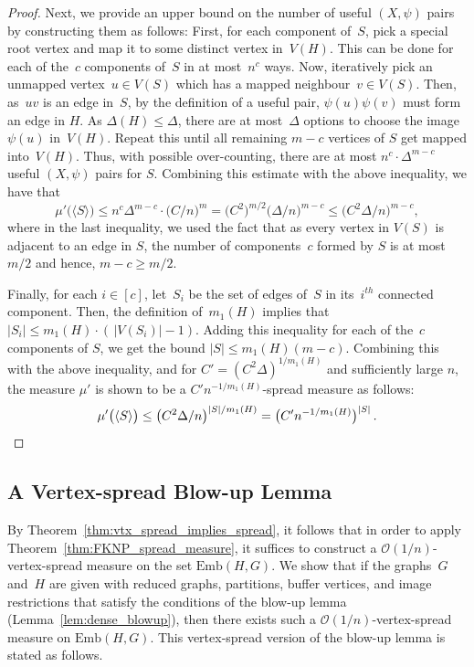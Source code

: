 \documentclass[final]{article}
\theoremstyle{definition}
\newcommand{\Emb}{\mathrm{Emb}}
\begin{document}
\begin{proof}
    Next, we provide an upper bound on the number of useful $(X, \psi)$ pairs by constructing them as follows: First, for each component of~$S$, pick a special root vertex and map it to some distinct vertex in~$V(H)$. This can be done for each of the~$c$ components of~$S$ in at most~$n^c$ ways. Now, iteratively pick an unmapped vertex~$u \in V(S)$ which has a mapped neighbour~$v \in V(S)$. Then, as~$uv$ is an edge in~$S$, by the definition of a useful pair, $\psi(u)\psi(v)$ must form an edge in $H$. As $\Delta(H) \leq \Delta$, there are at most~$\Delta$ options to choose the image~$\psi(u)$ in~$V(H)$. Repeat this until all remaining $m-c$ vertices of $S$ get mapped into~$V(H)$. Thus, with possible over-counting, there are at most $n^c \cdot \Delta^{m-c}$ useful $(X, \psi)$ pairs for $S$. Combining this estimate with the above inequality, we have that  
    $$\mu'\bigl(\langle S \rangle\bigr) \leq n^c \Delta^{m-c}\cdot \bigl(C/n\bigr)^m =  \bigl({C^2\bigr)^{m/2}\bigl(\Delta}/{n}\bigr)^{m-c} \leq \bigl(C^2\Delta/n\bigr)^{m-c},$$
    where in the last inequality, we used the fact that as every vertex in $V(S)$ is adjacent to an edge in $S$, the number of components~$c$ formed by $S$ is at most $m/2$ and hence, $m - c \geq m/2$.
    
    Finally, for each $i \in [c]$, let~$S_i$ be the set of edges of~$S$ in its~$i^{th}$ connected component. Then, the definition of~$m_1(H)$ implies that $|S_i| \leq m_1(H)\cdot(\, |V(S_i)| -1)$. Adding this inequality for each of the~$c$ components of $S$, we get the bound $|S| \leq m_1(H)(m-c)$. Combining this with the above inequality, and for $C' = (C^2\Delta)^{1/m_1(H)}$ and sufficiently large $n$, the measure $\mu'$ is shown to be a $C'n^{-1/m_1(H)}$-spread measure as follows:
    \[ \mu'\bigl(\langle S \rangle \bigr) \leq \big({C^2\Delta}/{n}\big)^{{|S|}/{m_1(H)}} = \big(C'n^{-1/m_1(H)}\big)^{|S|}\,. \qedhere \]
\end{proof}

\subsection{A Vertex-spread Blow-up Lemma}

By Theorem~\ref{thm:vtx_spread_implies_spread}, it follows that in order to apply Theorem~\ref{thm:FKNP_spread_measure}, it suffices to construct a $\mathcal{O}(1/n)$-vertex-spread measure on the set $\Emb(H,G)$.  We show that if the graphs~$G$ and~$H$ are given with reduced graphs, partitions, buffer vertices, and image restrictions that satisfy the conditions of the blow-up lemma (Lemma~\ref{lem:dense_blowup}), then there exists such a $\mathcal{O}(1/n)$-vertex-spread measure on $\Emb(H,G)$. This vertex-spread version of the blow-up lemma is stated as follows. 
\end{document}
